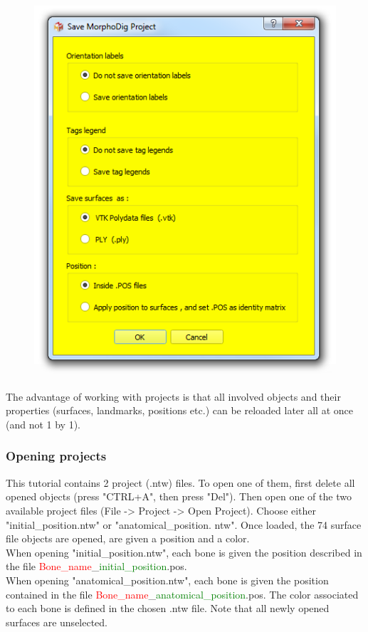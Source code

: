 \documentclass[12pt, a4paper]{book}
\begin{document}
\begin{figure}
  \centering  
 \includegraphics[scale=0.5]{../images/07/project/save_ntw.png}
\label{save_project_file}
\end{figure}

The advantage of working with projects is that all involved objects and their properties (surfaces, landmarks, positions etc.) can be reloaded later all at once (and not 1 by 1). 

\subsubsection{Opening projects}
This tutorial contains 2 project (.ntw) files. To open one of them, first delete all opened objects (press "CTRL+A", then press "Del"). Then open one of the two available project files (File -> Project -> Open Project). Choose either "initial\_position.ntw" or "anatomical\_position.
ntw". Once loaded, the 74 surface file objects are opened, are given a position and a color.\\
When
opening "initial\_position.ntw", each bone is given the position described in the file \textcolor{red}{Bone\_name}\_\textcolor{green}{initial\_position}.pos.\\
When opening "anatomical\_position.ntw", each bone is given the position contained in the file \textcolor{red}{Bone\_name}\_\textcolor{green}{anatomical\_position}.pos. The color associated to each bone is defined in the chosen .ntw file. Note that all newly opened surfaces are unselected.
\end{document}
